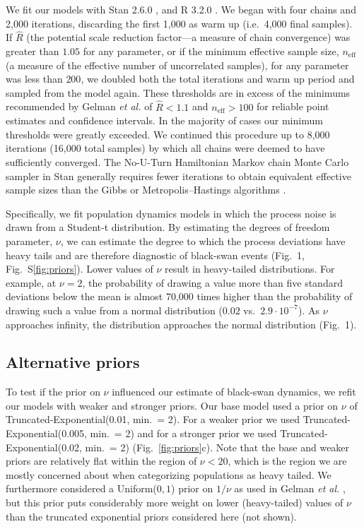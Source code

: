 We fit our models with Stan 2.6.0 \citep{stan-manual2015, hoffman2014}, and R
3.2.0 \citep{r2015}. We began with four chains and 2,000 iterations, discarding
the first 1,000 as warm up (i.e.~4,000 final samples). If \(\hat{R}\) (the
potential scale reduction factor---a measure of chain convergence) was greater
than \(1.05\) for any parameter, or if the minimum effective sample size,
\(n_\mathrm{eff}\) (a measure of the effective number of uncorrelated samples),
for any parameter was less than \(200\), we doubled both the total iterations
and warm up period and sampled from the model again. These thresholds are in
excess of the minimums recommended by Gelman \emph{et al.} \citep{gelman2006a} of
\(\hat{R} < 1.1\) and \(n_\mathrm{eff} > 100\) for reliable point estimates and
confidence intervals. In the majority of cases our minimum thresholds were
greatly exceeded. We continued this procedure up to 8,000 iterations (16,000
total samples) by which all chains were deemed to have sufficiently converged.
The No-U-Turn Hamiltonian Markov chain Monte Carlo sampler in Stan generally
requires fewer iterations to obtain equivalent effective sample sizes than the
Gibbs or Metropolis--Hastings algorithms \citep{stan-manual2015}.

Specifically, we fit population dynamics models in which the process noise is
drawn from a Student-t distribution. By estimating the degrees of freedom
parameter, \(\nu\), we can estimate the degree to which the process deviations
have heavy tails and are therefore diagnostic of black-swan events (Fig.~1,
Fig.~S\ref{fig:priors}). Lower values of \(\nu\) result in heavy-tailed
distributions. For example, at \(\nu = 2\), the probability of drawing a value
more than five standard deviations below the mean is almost 70,000 times higher
than the probability of drawing such a value from a normal distribution
(\(0.02\) vs.\ \(2.9\cdot10^{-7}\)). As \(\nu\) approaches infinity, the
distribution approaches the normal distribution (Fig.~1).

\subsection{Alternative priors}

To test if the prior on \(\nu\) influenced our estimate of black-swan dynamics,
we refit our models with weaker and stronger priors. Our base model used a
prior on \(\nu\) of Truncated-Exponential(0.01, min.\ = 2). For a weaker prior
we used Truncated-Exponential(0.005, min.\ = 2) and for a stronger prior we
used Truncated-Exponential(0.02, min.\ = 2) (Fig.~\ref{fig:priors}c). Note that
the base and weaker priors are relatively flat within the region of \(\nu <
20\), which is the region we are mostly concerned about when categorizing
populations as heavy tailed. We furthermore considered a Uniform(\(0, 1\))
prior on \(1/\nu\) as used in Gelman \emph{et al.} \citep{gelman2014}, but this
prior puts considerably more weight on lower (heavy-tailed) values of \(\nu\)
than the truncated exponential priors considered here (not shown).

